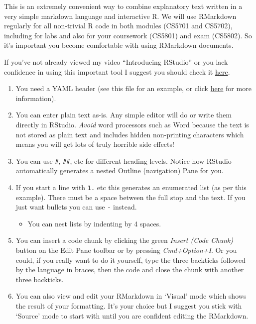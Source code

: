 \documentclass[
]{article}
\providecommand{\tightlist}{%
  \setlength{\itemsep}{0pt}\setlength{\parskip}{0pt}}
\begin{document}
This is an extremely convenient way to combine explanatory text written
in a very simple markdown language and interactive R. We will use
RMarkdown regularly for all non-trivial R code in both modules (CS5701
and CS5702), including for labs and also for your coursework (CS5801)
and exam (CS5802). So it's important you become comfortable with using
RMarkdown documents.

If you've not already viewed my video ``Introducing RStudio'' or you
lack confidence in using this important tool I suggest you should check
it
\href{https://www.loom.com/share/f0ecbbbc17dc43acbcdf9deb5fb22f3c}{here}.

\begin{enumerate}
\def\labelenumi{\arabic{enumi}.}
\tightlist
\item
  You need a YAML header (see this file for an example, or click
  \hyperref[YAML_appendix]{here} for more information).\\
\item
  You can enter plain text as-is. Any simple editor will do or write
  them directly in RStudio. \emph{Avoid} word processors such as Word
  because the text is not stored as plain text and includes hidden
  non-printing characters which means you will get lots of truly
  horrible side effects!\\
\item
  You can use \texttt{\#}, \texttt{\#\#}, etc for different heading
  levels. Notice how RStudio automatically generates a nested Outline
  (navigation) Pane for you.\\
\item
  If you start a line with \texttt{1.} etc this generates an enumerated
  list (as per this example). There must be a space between the full
  stop and the text. If you just want bullets you can use \texttt{-}
  instead.

  \begin{itemize}
  \tightlist
  \item
    You can nest lists by indenting by 4 spaces.\\
  \end{itemize}
\item
  You can insert a code chunk by clicking the green \emph{Insert (Code
  Chunk)} button on the Edit Pane toolbar or by pressing
  \emph{Cmd+Option+I}. Or you could, if you really want to do it
  yourself, type the three backticks followed by the language in braces,
  then the code and close the chunk with another three backticks.\\
\item
  You can also view and edit your RMarkdown in `Visual' mode which shows
  the result of your formatting. It's your choice but I suggest you
  stick with `Source' mode to start with until you are confident editing
  the RMarkdown.
\end{enumerate}
\end{document}
